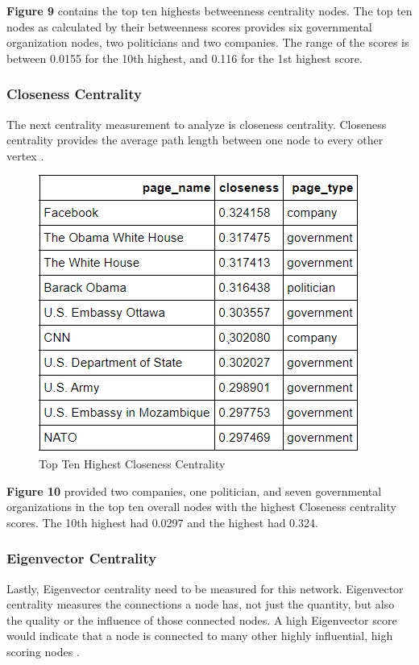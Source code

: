 \documentclass[11pt,twocolumn]{article}
\begin{document}
\textbf{Figure 9} contains the top ten highests betweenness centrality nodes. The top ten nodes as calculated by their betweenness scores provides six governmental organization nodes, two politicians and two companies. The range of the scores is between 0.0155 for the 10th highest, and 0.116 for the 1st highest score.



\subsubsection{Closeness Centrality}
The next centrality measurement to analyze is closeness centrality. Closeness centrality provides the average path length between one node to every other vertex \cite{newman2008mathematics}.

\begin{figure}[hbt!]
\includegraphics[scale=0.5]{top_ten_closeness.png} 
\caption{Top Ten Highest Closeness Centrality}
\end{figure}

\textbf{Figure 10} provided two companies, one politician, and seven governmental organizations in the top ten overall nodes with the highest Closeness centrality scores. The 10th highest had 0.0297 and the highest had 0.324.


\subsubsection{Eigenvector Centrality} 

Lastly, Eigenvector centrality need to be measured for this network. Eigenvector centrality measures the connections a node has, not just the quantity, but also the quality or the influence of those connected nodes. A high Eigenvector score would indicate that a node is connected to many other highly influential, high scoring nodes \cite{newman2008mathematics}. 
 
\end{document}
